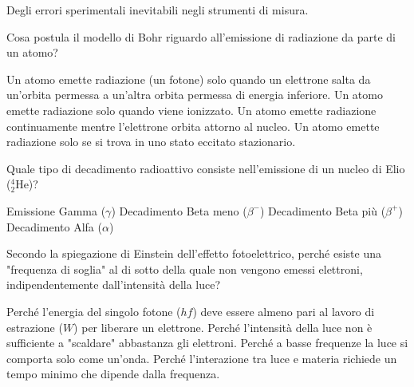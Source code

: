 \documentclass{exam}%
\begin{document}
\begin{questions}
\begin{choices}
\choice Degli errori sperimentali inevitabili negli strumenti di misura.%
\end{choices}%
\question Cosa postula il modello di Bohr riguardo all'emissione di radiazione da parte di un atomo?%
\vspace{0.2em}%
\begin{choices}%
\choice Un atomo emette radiazione (un fotone) solo quando un elettrone salta da un'orbita permessa a un'altra orbita permessa di energia inferiore.%
\choice Un atomo emette radiazione solo quando viene ionizzato.%
\choice Un atomo emette radiazione continuamente mentre l'elettrone orbita attorno al nucleo.%
\choice Un atomo emette radiazione solo se si trova in uno stato eccitato stazionario.%
\end{choices}%
\question Quale tipo di decadimento radioattivo consiste nell'emissione di un nucleo di Elio ($^4_2\text{He}$)?%
\vspace{0.2em}%
\begin{multicols}{2}%
\begin{choices}%
\choice Emissione Gamma ($\gamma$)%
\choice Decadimento Beta meno ($\beta^-$)%
\choice Decadimento Beta più ($\beta^+$)%
\choice Decadimento Alfa ($\alpha$)%
\end{choices}%
\end{multicols}%
\question Secondo la spiegazione di Einstein dell'effetto fotoelettrico, perché esiste una "frequenza di soglia" al di sotto della quale non vengono emessi elettroni, indipendentemente dall'intensità della luce?%
\vspace{0.2em}%
\begin{choices}%
\choice Perché l'energia del singolo fotone ($hf$) deve essere almeno pari al lavoro di estrazione ($W$) per liberare un elettrone.%
\choice Perché l'intensità della luce non è sufficiente a "scaldare" abbastanza gli elettroni.%
\choice Perché a basse frequenze la luce si comporta solo come un'onda.%
\choice Perché l'interazione tra luce e materia richiede un tempo minimo che dipende dalla frequenza.%
\end{choices}%
\end{questions}%
\end{document}
